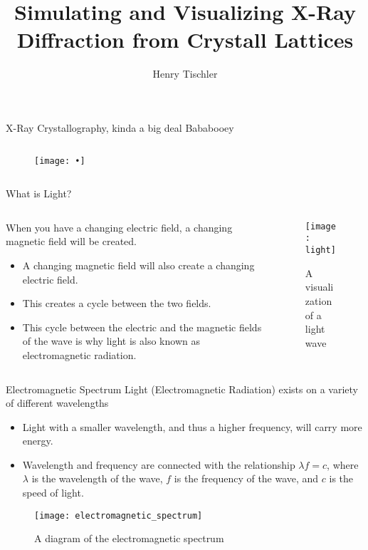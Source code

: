 \documentclass[aspectratio=169]{beamer}
\title {Simulating and Visualizing X-Ray Diffraction from Crystall Lattices}
\author{Henry Tischler}
\institute[Institute of Computing in Research]
\begin{document}
\titlepage

\begin{frame}[t]{X-Ray Crystallography, kinda a big deal}
	Bababooey
	
	\begin{columns}
		\begin{column}
			\begin{figure}
				\texttt{[image: •]}
			\end{figure}
		\end{column}
	
	\end{columns}
\end{frame}

\begin {frame}{What is Light?}
\begin{columns}
				
	\begin{column}[b]{.5\textwidth}
		When you have a changing electric field, a changing magnetic field will be created.
		\begin{itemize}
			\item A changing magnetic field will also create a changing electric field.
			\item This creates a cycle between the two fields.
			\item This cycle between the electric and the magnetic fields of the wave is why light is also known as electromagnetic radiation.
		\end{itemize}		
	\end{column}
				
	\begin{column}{.5\textwidth}
		\begin{figure}
			\texttt{[image: light]}
			\caption{A visualization of a light wave}
		\end{figure}
	\end{column}
				
\end{columns}
\end{frame}

\begin{frame}[t]{Electromagnetic Spectrum}
	Light (Electromagnetic Radiation) exists on a variety of different wavelengths
	\begin{itemize}
			\item Light with a smaller wavelength, and thus a higher frequency, will carry more energy.
		\item Wavelength and frequency are connected with the relationship $\lambda f = c$, where $\lambda$ is the wavelength of the wave, $f$ is the frequency of the wave, and $c$ is the speed of light.
	\end{itemize}
	\begin{figure}
		\texttt{[image: electromagnetic\_spectrum]}
		\caption {A diagram of the electromagnetic spectrum}
	\end{figure}
\end{frame}
\end{document}
